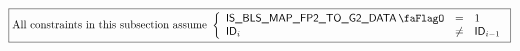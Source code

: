 \[
    \boxed{\text{All constraints in this subsection assume }
        \left\{ \begin{array}{lcl}
            \isBlsMapFpTwoToGTwoData & =    & 1            \\
            \blsId_{i}               & \neq & \blsId_{i-1} \\
        \end{array} \right.
    }
\]